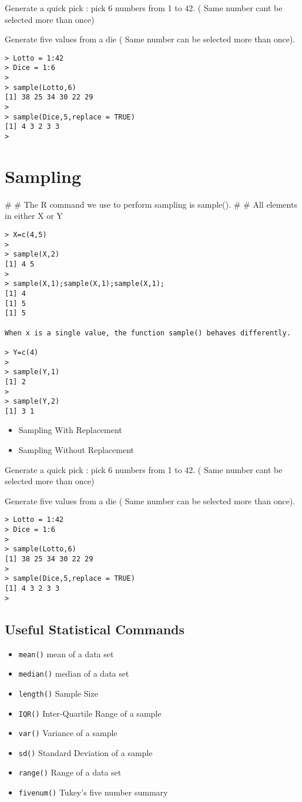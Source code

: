 \documentclass[a4paper,12pt]{article}
\begin{document}
Generate a quick pick : pick 6 numbers from 1 to 42. ( Same number cant be selected more than once)

Generate five values from a die ( Same number can be selected more than once).

\begin{verbatim}
> Lotto = 1:42
> Dice = 1:6
> 
> sample(Lotto,6)
[1] 38 25 34 30 22 29
> 
> sample(Dice,5,replace = TRUE)
[1] 4 3 2 3 3
>
\end{verbatim}
\section{Sampling}
# 
# The R command we use to perform sampling is sample().
# 
# All elements in either X or Y



\begin{verbatim}
> X=c(4,5)
>
> sample(X,2)
[1] 4 5
>
> sample(X,1);sample(X,1);sample(X,1);
[1] 4
[1] 5
[1] 5

When x is a single value, the function sample() behaves differently.

> Y=c(4)
>
> sample(Y,1)
[1] 2
> 
> sample(Y,2)
[1] 3 1

\end{verbatim}

\begin{itemize}
	\item Sampling With Replacement
	\item Sampling Without Replacement
\end{itemize}
Generate a quick pick : pick 6 numbers from 1 to 42. ( Same number cant be selected more than once)

Generate five values from a die ( Same number can be selected more than once).

\begin{verbatim}
> Lotto = 1:42
> Dice = 1:6
> 
> sample(Lotto,6)
[1] 38 25 34 30 22 29
> 
> sample(Dice,5,replace = TRUE)
[1] 4 3 2 3 3
>
\end{verbatim}
\newpage
\subsection{Useful Statistical Commands}
\begin{itemize}
	\item \texttt{mean()} mean of a data set
	\item \texttt{median()} median of a data set
	\item \texttt{length()} Sample Size
	\item \texttt{IQR()} Inter-Quartile Range of a sample
	\item \texttt{var()} Variance of a sample
	\item \texttt{sd()} Standard Deviation  of a sample
	\item \texttt{range()} Range of a data set
	\item \texttt{fivenum()} Tukey's five number summary
\end{itemize}
\end{document}
